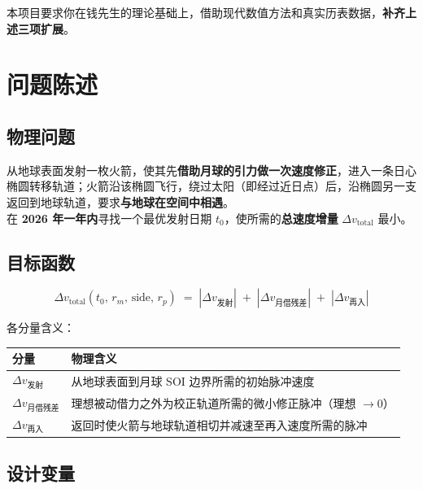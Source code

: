 \documentclass[11pt,a4paper]{ctexart}
\begin{document}
本项目要求你在钱先生的理论基础上，借助现代数值方法和真实历表数据，\textbf{补齐上述三项扩展}。

\section{问题陈述}

\subsection{物理问题}

\begin{notebox}[核心任务]
从地球表面发射一枚火箭，使其先\textbf{借助月球的引力做一次速度修正}，进入一条日心椭圆转移轨道；火箭沿该椭圆飞行，绕过太阳（即经过近日点）后，沿椭圆另一支返回到地球轨道，要求\textbf{与地球在空间中相遇}。\\[4pt]
在 \textbf{2026 年一年内}寻找一个最优发射日期 $t_0$，使所需的\textbf{总速度增量} $\Delta v_{\text{total}}$ 最小。
\end{notebox}

\subsection{目标函数}

\begin{equation}\label{eq:objective}
    \Delta v_{\text{total}}(t_0,\,r_m,\,\text{side},\,r_p) \;=\;
    |\Delta v_{\text{发射}}| \;+\; |\Delta v_{\text{月借残差}}| \;+\; |\Delta v_{\text{再入}}|
\end{equation}

各分量含义：

\begin{tabular}{@{}ll@{}}
\toprule
分量 & 物理含义 \\
\midrule
$\Delta v_{\text{发射}}$     & 从地球表面到月球 SOI 边界所需的初始脉冲速度 \\
$\Delta v_{\text{月借残差}}$ & 理想被动借力之外为校正轨道所需的微小修正脉冲（理想 $\to 0$） \\
$\Delta v_{\text{再入}}$     & 返回时使火箭与地球轨道相切并减速至再入速度所需的脉冲 \\
\bottomrule
\end{tabular}

\subsection{设计变量}
\end{document}
